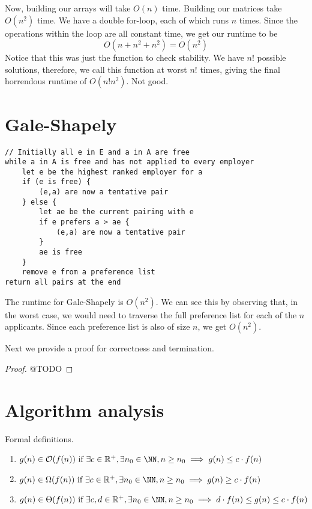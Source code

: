 \documentclass{tufte-handout}
\newcommand{\RR}{\mathbb{R}}
\newcommand{\fancy}[1]{\mathcal{#1}}
\theoremstyle{definition}
\begin{document}
    Now, building our arrays will take $O(n)$ time. Building our matrices take $O(n^2)$ time. We have a double for-loop, each of which runs $n$ times. Since the operations within the loop are all constant time, we get our runtime to be 
    $$ O(n + n^2 + n^2) = O(n^2) $$
    Notice that this was just the function to check stability. We have $n!$ possible solutions, therefore, we call this function at worst $n!$ times, giving the final horrendous runtime of $O(n!n^2)$. Not good.

\section{Gale-Shapely}
\begin{verbatim}
// Initially all e in E and a in A are free
while a in A is free and has not applied to every employer
    let e be the highest ranked employer for a 
    if (e is free) {
        (e,a) are now a tentative pair
    } else {
        let ae be the current pairing with e  
        if e prefers a > ae {
            (e,a) are now a tentative pair
        }
        ae is free
    }
    remove e from a preference list
return all pairs at the end
\end{verbatim}

The runtime for Gale-Shapely is $O(n^2)$. We can see this by observing that, in the worst case, we would need to traverse the full preference list for each of the $n$ applicants. Since each preference list is also of size $n$, we get $O(n^2)$.

Next we provide a proof for correctness and termination.
\begin{proof}
    @TODO
\end{proof}

\section{Algorithm analysis}
Formal definitions. \begin{enumerate}
    \item $g(n) \in \fancy{O}(f(n)) \text{ if } \exists c \in \RR^+, \exists n_0 \in \NN, n \geq n_0 \implies g(n) \leq c \cdot f(n)$
    \item $g(n) \in \Omega(f(n)) \text{ if } \exists c \in \RR^+, \exists n_0 \in \NN, n \geq n_0 \implies g(n) \geq c \cdot f(n)$
    \item $g(n) \in \Theta(f(n)) \text{ if } \exists c,d \in \RR^+, \exists n_0 \in \NN, n \geq n_0 \implies d \cdot f(n) \leq g(n) \leq c \cdot f(n)$
\end{enumerate}
\end{document}
